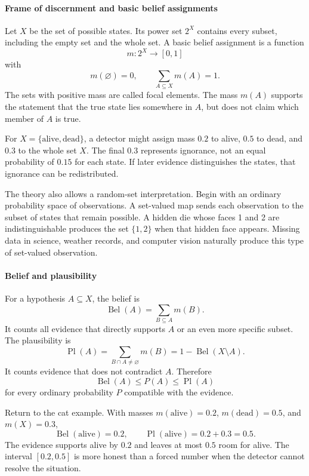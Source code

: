 \paragraph{Frame of discernment and basic belief assignments}

Let $X$ be the set of possible states. Its power set $2^X$ contains every subset, including the empty set and the whole set. A basic belief assignment is a function
\[
 m:2^X\longrightarrow[0,1]
\]
with
\[
 m(\varnothing)=0,\qquad \sum_{A\subseteq X}m(A)=1.
\]
The sets with positive mass are called focal elements. The mass $m(A)$ supports the statement that the true state lies somewhere in $A$, but does not claim which member of $A$ is true.

For $X=\{\text{alive},\text{dead}\}$, a detector might assign mass $0.2$ to alive, $0.5$ to dead, and $0.3$ to the whole set $X$. The final $0.3$ represents ignorance, not an equal probability of $0.15$ for each state. If later evidence distinguishes the states, that ignorance can be redistributed.

The theory also allows a random-set interpretation. Begin with an ordinary probability space of observations. A set-valued map sends each observation to the subset of states that remain possible. A hidden die whose faces 1 and 2 are indistinguishable produces the set $\{1,2\}$ when that hidden face appears. Missing data in science, weather records, and computer vision naturally produce this type of set-valued observation. \cite{dempster_shafer_theory_ref1,dempster_shafer_theory_ref3}

\paragraph{Belief and plausibility}

For a hypothesis $A\subseteq X$, the belief is
\[
 \operatorname{Bel}(A)=\sum_{B\subseteq A}m(B).
\]
It counts all evidence that directly supports $A$ or an even more specific subset. The plausibility is
\[
 \operatorname{Pl}(A)=\sum_{B\cap A\neq\varnothing}m(B)
 =1-\operatorname{Bel}(X\setminus A).
\]
It counts evidence that does not contradict $A$. Therefore
\[
 \operatorname{Bel}(A)\leq P(A)\leq\operatorname{Pl}(A)
\]
for every ordinary probability $P$ compatible with the evidence.

Return to the cat example. With masses $m(\text{alive})=0.2$, $m(\text{dead})=0.5$, and $m(X)=0.3$,
\[
 \operatorname{Bel}(\text{alive})=0.2,\qquad
 \operatorname{Pl}(\text{alive})=0.2+0.3=0.5.
\]
The evidence supports alive by $0.2$ and leaves at most $0.5$ room for alive. The interval $[0.2,0.5]$ is more honest than a forced number when the detector cannot resolve the situation.

